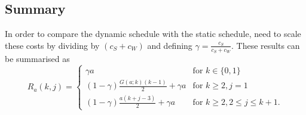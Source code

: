\subsection{Summary}
In order to compare the dynamic schedule with the static schedule, need to scale these costs by dividing by $(c_{S} + c_{W})$ and defining $\gamma = \frac{c_{S}}{c_{S} + c_{W}}$. These results can be summarised as
\begin{equation}
	R_{a} (k, j) = \begin{cases}
		\gamma a & \text{for $k \in \{ 0, 1 \}$} \\
		(1 - \gamma) \frac{G (a; k) (k - 1)}{2} + \gamma a & \text{for $k \geq 2, j = 1$} \\
		(1 - \gamma) \frac{a (k + j - 3)}{2} + \gamma a & \text{for $k \geq 2, 2 \leq j \leq k + 1$}.
	\end{cases}
\end{equation}

















































